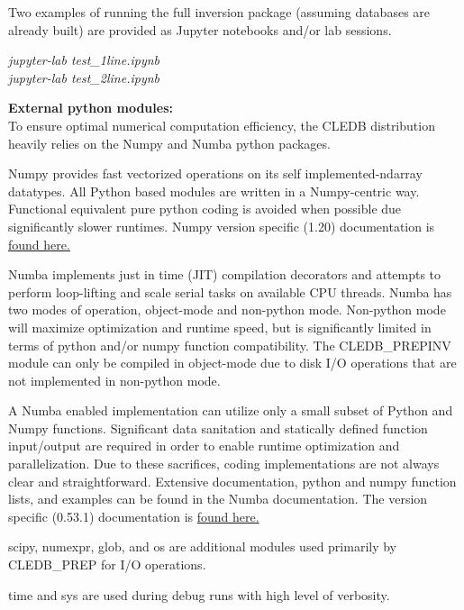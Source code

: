 \documentclass{article}
\begin{document}
Two examples of running the full inversion package (assuming databases are already built) are provided as Jupyter notebooks and/or lab sessions.

\emph{\color{red}jupyter-lab test\_1line.ipynb}\\
\emph{\color{red}jupyter-lab test\_2line.ipynb}



\textbf{\large External python modules:\\}
To ensure optimal numerical computation efficiency, the CLEDB distribution heavily relies on the Numpy and Numba python packages. 
\begin{description} [font=\normalfont,leftmargin=0.6in,style=multiline]
	\item[Numpy]
Numpy provides fast vectorized operations on its self implemented-ndarray datatypes. All Python based modules are written in a Numpy-centric way. Functional equivalent pure python coding is avoided when possible due significantly slower runtimes. Numpy version specific (1.20) documentation is \href{https://numpy.org/doc/1.20/}{found here.}
	\item[Numba]
Numba implements just in time (JIT) compilation decorators and attempts to perform loop-lifting and scale serial tasks on available CPU threads. Numba has two modes of operation, object-mode and non-python mode. Non-python mode will maximize optimization and runtime speed, but is significantly limited in terms of python and/or  numpy function compatibility. The CLEDB\_PREPINV module can only be compiled in object-mode due to disk I/O operations that are not implemented in non-python mode.

A Numba enabled implementation can utilize only a small subset of Python and Numpy functions. Significant data sanitation and statically defined function input/output are required in order to enable runtime optimization and parallelization. Due to these sacrifices, coding implementations are not always clear and straightforward. Extensive documentation, python and numpy function lists, and examples can be found in the Numba documentation. The version specific (0.53.1) documentation is \href{https://numba.readthedocs.io/en/0.53.1/}{found here.}
	\item[Others]
scipy, numexpr, glob, and os are additional modules used primarily by CLEDB\_PREP for I/O operations.
	\item[]
time and sys are used during debug runs with high level of verbosity.
\end{description}
\end{document}
